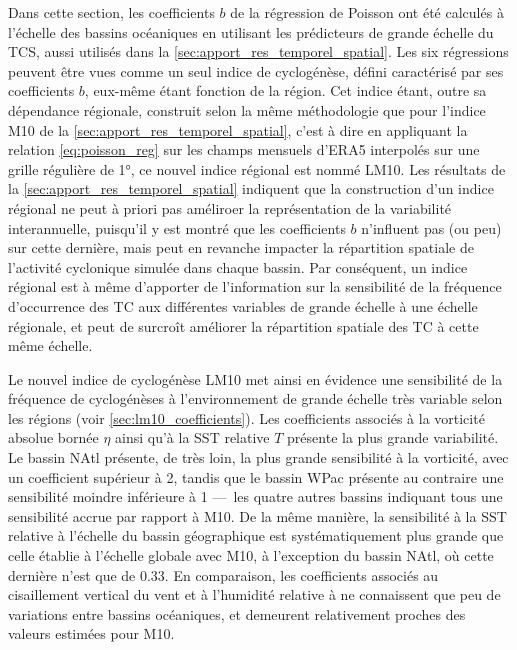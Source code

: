 \documentclass[../main.tex]{subfiles}
\begin{document}
Dans cette section, les coefficients $b$ de la régression de Poisson ont été calculés à l'échelle des bassins océaniques en utilisant les prédicteurs de grande
échelle du TCS, aussi utilisés dans la \cref{sec:apport_res_temporel_spatial}. Les six régressions peuvent être vues comme un seul indice de cyclogénèse, défini
caractérisé par ses coefficients $b$, eux-même étant fonction de la région. Cet indice étant, outre sa dépendance régionale, construit selon la même
méthodologie que pour l'indice M10 de la \cref{sec:apport_res_temporel_spatial}, c'est à dire en appliquant la relation \ref{eq:poisson_reg} sur les champs
mensuels d'ERA5 interpolés sur une grille régulière de \ang{1}, ce nouvel indice régional est nommé LM10. Les résultats de la
\cref{sec:apport_res_temporel_spatial} indiquent que la construction d'un indice régional ne peut à priori pas améliroer la représentation de la variabilité
interannuelle, puisqu'il y est montré que les coefficients $b$ n'influent pas (ou peu) sur cette dernière, mais peut en revanche impacter la répartition
spatiale de l'activité cyclonique simulée dans chaque bassin. Par conséquent, un indice régional est à même d'apporter de l'information sur la sensibilité de la
fréquence d'occurrence des TC aux différentes variables de grande échelle à une échelle régionale, et peut de surcroît améliorer la répartition spatiale des TC
à cette même échelle.

Le nouvel indice de cyclogénèse LM10 met ainsi en évidence une sensibilité de la fréquence de cyclogénèses à l'environnement de grande échelle très variable
selon les régions (voir \cref{sec:lm10_coefficients}). Les coefficients associés à la vorticité absolue bornée $\eta$ ainsi qu'à la SST relative $T$ présente la
plus grande variabilité. Le bassin NAtl présente, de très loin, la plus grande sensibilité à la vorticité, avec un coefficient supérieur à \num{2}, tandis que
le bassin WPac présente au contraire une sensibilité moindre inférieure à \num{1} ---~les quatre autres bassins indiquant tous une sensibilité accrue par
rapport à M10. De la même manière, la sensibilité à la SST relative à l'échelle du bassin géographique est systématiquement plus grande que celle établie à
l'échelle globale avec M10, à l'exception du bassin NAtl, où cette dernière n'est que de \num{0.33}. En comparaison, les coefficients associés au cisaillement
vertical du vent et à l'humidité relative à  ne connaissent que peu de variations entre bassins océaniques, et demeurent relativement proches des
valeurs estimées pour M10.
\end{document}
